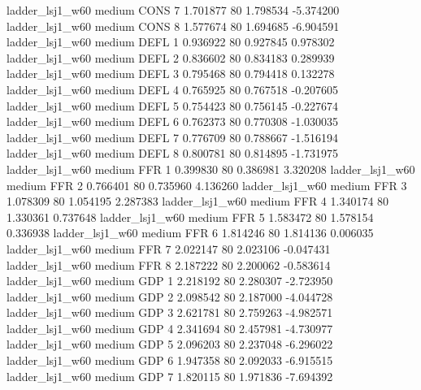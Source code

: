     ladder_lsj1_w60     medium     CONS                 7  1.701877 80       1.798534          -5.374200
    ladder_lsj1_w60     medium     CONS                 8  1.577674 80       1.694685          -6.904591
    ladder_lsj1_w60     medium     DEFL                 1  0.936922 80       0.927845           0.978302
    ladder_lsj1_w60     medium     DEFL                 2  0.836602 80       0.834183           0.289939
    ladder_lsj1_w60     medium     DEFL                 3  0.795468 80       0.794418           0.132278
    ladder_lsj1_w60     medium     DEFL                 4  0.765925 80       0.767518          -0.207605
    ladder_lsj1_w60     medium     DEFL                 5  0.754423 80       0.756145          -0.227674
    ladder_lsj1_w60     medium     DEFL                 6  0.762373 80       0.770308          -1.030035
    ladder_lsj1_w60     medium     DEFL                 7  0.776709 80       0.788667          -1.516194
    ladder_lsj1_w60     medium     DEFL                 8  0.800781 80       0.814895          -1.731975
    ladder_lsj1_w60     medium      FFR                 1  0.399830 80       0.386981           3.320208
    ladder_lsj1_w60     medium      FFR                 2  0.766401 80       0.735960           4.136260
    ladder_lsj1_w60     medium      FFR                 3  1.078309 80       1.054195           2.287383
    ladder_lsj1_w60     medium      FFR                 4  1.340174 80       1.330361           0.737648
    ladder_lsj1_w60     medium      FFR                 5  1.583472 80       1.578154           0.336938
    ladder_lsj1_w60     medium      FFR                 6  1.814246 80       1.814136           0.006035
    ladder_lsj1_w60     medium      FFR                 7  2.022147 80       2.023106          -0.047431
    ladder_lsj1_w60     medium      FFR                 8  2.187222 80       2.200062          -0.583614
    ladder_lsj1_w60     medium      GDP                 1  2.218192 80       2.280307          -2.723950
    ladder_lsj1_w60     medium      GDP                 2  2.098542 80       2.187000          -4.044728
    ladder_lsj1_w60     medium      GDP                 3  2.621781 80       2.759263          -4.982571
    ladder_lsj1_w60     medium      GDP                 4  2.341694 80       2.457981          -4.730977
    ladder_lsj1_w60     medium      GDP                 5  2.096203 80       2.237048          -6.296022
    ladder_lsj1_w60     medium      GDP                 6  1.947358 80       2.092033          -6.915515
    ladder_lsj1_w60     medium      GDP                 7  1.820115 80       1.971836          -7.694392
